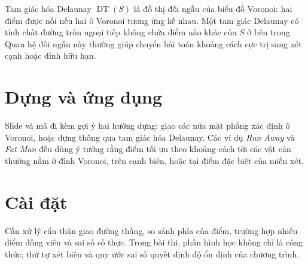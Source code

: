 \documentclass[11pt]{article}
\newcommand{\DT}{\operatorname{DT}}
\begin{document}
Tam giác hóa Delaunay \(\DT(S)\) là đồ thị đối ngẫu của biểu đồ Voronoi: hai
điểm được nối nếu hai ô Voronoi tương ứng kề nhau. Một tam giác Delaunay có
tính chất đường tròn ngoại tiếp không chứa điểm nào khác của \(S\) ở bên
trong. Quan hệ đối ngẫu này thường giúp chuyển bài toán khoảng cách cực trị
sang xét cạnh hoặc đỉnh hữu hạn.

\section{Dựng và ứng dụng}

Slide và mã đi kèm gợi ý hai hướng dựng: giao các nửa mặt phẳng xác định ô
Voronoi, hoặc dựng thông qua tam giác hóa Delaunay. Các ví dụ \emph{Run Away}
và \emph{Fat Man} đều dùng ý tưởng rằng điểm tối ưu theo khoảng cách tới các
vật cản thường nằm ở đỉnh Voronoi, trên cạnh biên, hoặc tại điểm đặc biệt của
miền xét.

\section{Cài đặt}

Cần xử lý cẩn thận giao đường thẳng, so sánh phía của điểm, trường hợp nhiều
điểm đồng viên và sai số số thực. Trong bài thi, phần hình học không chỉ là
công thức; thứ tự xét biên và quy ước sai số quyết định độ ổn định của chương
trình.
\end{document}
